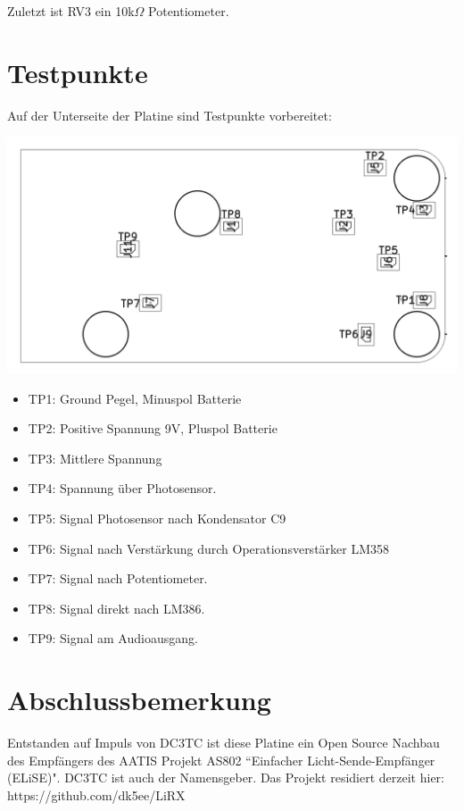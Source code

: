 \documentclass[]{article}
\begin{document}
Zuletzt ist RV3 ein 10k$\Omega$ Potentiometer.
\section{Testpunkte}
Auf der Unterseite der Platine sind Testpunkte vorbereitet:

\includegraphics[width=1.0\linewidth]{testpoints.png}

\begin{itemize}
	\item TP1: Ground Pegel, Minuspol Batterie
	\item TP2: Positive Spannung 9V, Pluspol Batterie
	\item TP3: Mittlere Spannung
	\item TP4: Spannung über Photosensor.
	\item TP5: Signal Photosensor nach Kondensator C9
	\item TP6: Signal nach Verstärkung durch Operationsverstärker LM358
	\item TP7: Signal nach Potentiometer.
	\item TP8: Signal direkt nach LM386.
	\item TP9: Signal am Audioausgang.
\end{itemize}
\section{Abschlussbemerkung}
Entstanden auf Impuls von DC3TC ist diese Platine ein Open Source Nachbau des Empfängers des AATIS Projekt AS802 ``Einfacher Licht-Sende-Empfänger (ELiSE)".
DC3TC ist auch der Namensgeber. Das Projekt residiert derzeit hier: https://github.com/dk5ee/LiRX
\end{document}
